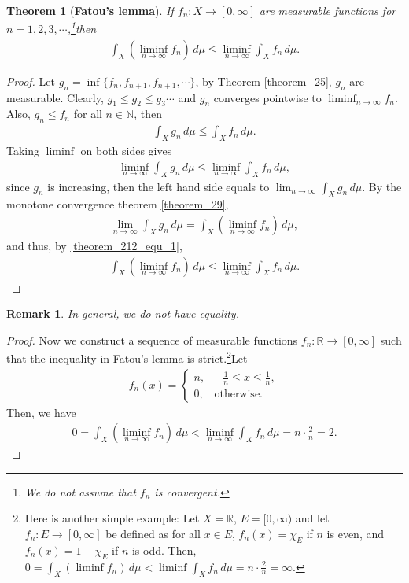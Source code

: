 \documentclass[11pt]{book}
\newtheorem{theorem}{Theorem}[chapter]
\newtheorem{remark}{Remark}[chapter]
\theoremstyle{definition}
\numberwithin{equation}{chapter}
\begin{document}
\medskip

\begin{theorem}[{\bf Fatou's lemma}]\label{theorem_212}
If $f_n: X \to [0,\infty]$ are measurable functions for $n = 1,2,3,\cdots$,\footnote{We do not assume that $f_n$ is convergent.}then
\begin{align*}
    \int_X \left(\liminf_{n\to\infty} f_n\right)\,d\mu \leq \liminf_{n\to\infty} \int_X f_n\,d\mu.
\end{align*}
\end{theorem}
\begin{proof}
Let $g_n = \inf\{f_n,f_{n+1},f_{n+1},\cdots\}$, by Theorem \ref{theorem_25}, $g_n$ are measurable. Clearly, $g_1 \leq g_2 \leq g_3 \cdots$ and $g_n$ converges pointwise to $\liminf_{n\to\infty} f_n$. Also, $g_n \leq f_n$ for all $n \in \mathbb{N}$, then
\begin{align*}
    \int_X g_n\,d\mu \leq \int_X f_n\,d\mu.
\end{align*}
Taking $\liminf$ on both sides gives
\begin{align}\label{theorem_212_equ_1}
    \liminf_{n\to\infty} \int_X g_n\,d\mu \leq \liminf_{n\to\infty} \int_X f_n\,d\mu,
\end{align}
since $g_n$ is increasing, then the left hand side equals to $\lim_{n\to\infty} \int_X g_n\,d\mu$. By the monotone convergence theorem \ref{theorem_29}, 
\begin{align*}
    \lim_{n\to\infty} \int_X g_n\,d\mu = \int_X \left(\liminf_{n\to\infty} f_n\right)\,d\mu,
\end{align*}
and thus, by \eqref{theorem_212_equ_1}, 
\begin{align*}
    \int_X \left(\liminf_{n\to\infty} f_n\right)\,d\mu \leq \liminf_{n\to\infty} \int_X f_n\,d\mu.
\end{align*}
\end{proof}

\medskip

\begin{remark}
In general, we do not have equality.
\end{remark}
\begin{proof}
Now we construct a sequence of measurable functions $f_n: \mathbb{R} \to [0,\infty]$ such that the inequality in Fatou’s lemma is strict.\footnote{Here is another simple example: Let $X = \mathbb{R}$, $E = [0,\infty)$ and let $f_n: E \to [0,\infty]$ be defined as for all $x \in E$, $f_n(x) = \chi_E$ if $n$ is even, and $f_n(x) = 1 - \chi_E$ if $n$ is odd. Then, $0 = \int_X \left(\liminf f_n\right)\,d\mu < \liminf \int_X f_n\,d\mu = n \cdot \frac{2}{n} = \infty$.}Let
\begin{align*}
    f_n(x) = \begin{cases}
        n, & -\frac{1}{n} \leq x \leq \frac{1}{n}, \\
        0, & \text{otherwise}.
    \end{cases}
\end{align*}
Then, we have 
\begin{align*}
    0 = \int_X \left(\liminf_{n\to\infty} f_n\right)\,d\mu < \liminf_{n\to\infty} \int_X f_n\,d\mu = n \cdot \frac{2}{n} = 2.
\end{align*}
\end{proof}
\end{document}
